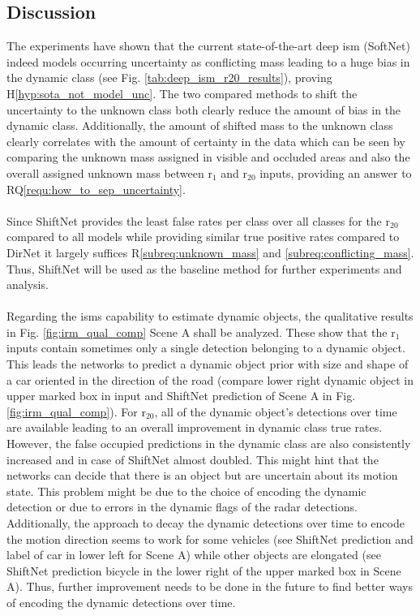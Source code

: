 \subsection{Discussion}
\label{subsec:discussion_aleat_uncert}
The experiments have shown that the current state-of-the-art deep \gls{ism} (SoftNet) indeed models occurring uncertainty as conflicting mass leading to a huge bias in the dynamic class (see Fig. \ref{tab:deep_ism_r20_results}), proving H\ref{hyp:sota_not_model_unc}. The two compared methods to shift the uncertainty to the unknown class both clearly reduce the amount of bias in the dynamic class. Additionally, the amount of shifted mass to the unknown class clearly correlates with the amount of certainty in the data which can be seen by comparing the unknown mass assigned in visible and occluded areas and also the overall assigned unknown mass between \gls{r}$_1$ and \gls{r}$_{20}$ inputs, providing an answer to RQ\ref{requ:how_to_sep_uncertainty}. 
\\\\
Since ShiftNet provides the least false rates per class over all classes for the \gls{r}$_{20}$ compared to all models while providing similar true positive rates compared to DirNet it largely suffices R\ref{subreq:unknown_mass} and \ref{subreq:conflicting_mass}. Thus, ShiftNet will be used as the baseline method for further experiments and analysis.
\\\\
Regarding the \gls{ism}s capability to estimate dynamic objects, the qualitative results in Fig. \ref{fig:irm_qual_comp} Scene A shall be analyzed. These show that the \gls{r}$_1$ inputs contain sometimes only a single detection belonging to a dynamic object. This leads the networks to predict a dynamic object prior with size and shape of a car oriented in the direction of the road (compare lower right dynamic object in upper marked box in input and ShiftNet prediction of Scene A in Fig. \ref{fig:irm_qual_comp}). For \gls{r}$_{20}$, all of the dynamic object's detections over time are available leading to an overall improvement in dynamic class true rates. However, the false occupied predictions in the dynamic class are also consistently increased and in case of ShiftNet almost doubled. This might hint that the networks can decide that there is an object but are uncertain about its motion state. This problem might be due to the choice of encoding the dynamic detection or due to errors in the dynamic flags of the radar detections. Additionally, the approach to decay the dynamic detections over time to encode the motion direction seems to work for some vehicles (see ShiftNet prediction and label of car in lower left for Scene A) while other objects are elongated (see ShiftNet prediction bicycle in the lower right of the upper marked box in Scene A). Thus, further improvement needs to be done in the future to find better ways of encoding the dynamic detections over time.
